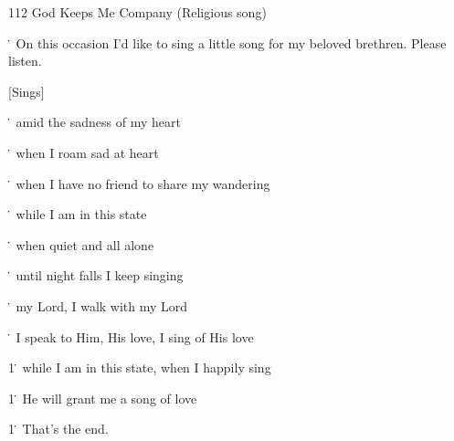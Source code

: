 
112 God Keeps Me Company (Religious song)

\. On this occasion I'd like to sing a little song for my beloved brethren. Please
listen.

[Sings]

\. amid the sadness of my heart

\. when I roam sad at heart

\. when I have no friend to share my wandering

\. while I am in this state

\. when quiet and all alone

\. until night falls I keep singing

\. my Lord, I walk with my Lord

\. I speak to Him, His love, I sing of His love

1\. while I am in this state, when I happily sing

1\. He will grant me a song of love

1\. That's the end.



